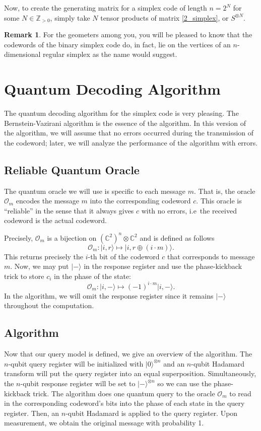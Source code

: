 \documentclass[12pt,twoside]{reedthesis}
\theoremstyle{definition}
\newtheorem{remark}[theorem]{Remark}
\newcommand{\Z}{\mathbb{Z}}
\newcommand{\C}{\mathbb{C}}
\newcommand{\ket}[1]{\ensuremath{\lvert #1\rangle}\xspace}
\newcommand{\Hminus}{\ensuremath{\lvert- \rangle}\xspace}
\begin{document}
Now, to create the generating matrix for a simplex code of length $n = 2^N$ for some $N \in \Z_{>0}$, simply take $N$ tensor products of matrix \ref{2_simplex}, or $S^{\otimes N}$.
\begin{remark}
For the geometers among you, you will be pleased to know that the codewords of the binary simplex code do, in fact, lie on the vertices of an $n$-dimensional regular simplex as the name would suggest.
\end{remark}
\section{Quantum Decoding Algorithm}
The quantum decoding algorithm for the simplex code is very pleasing. The Bernstein-Vazirani algorithm is the essence of the algorithm. In this version of the algorithm, we will assume that no errors occurred during the transmission of the codeword; later, we will analyze the performance of the algorithm with errors.
\subsection{Reliable Quantum Oracle}
The quantum oracle we will use is specific to each message $m$. That is, the oracle $\mathcal{O}_m$ encodes the message $m$ into the corresponding codeword $c$. This oracle is ``reliable'' in the sense that it always gives $c$ with no errors, i.e~the received codeword is the actual codeword. 

Precisely, $\mathcal{O}_m$ is a bijection on $(\C^2)^n \otimes \C^2$ and is defined as follows
\begin{equation*}
\mathcal{O}_m: \ket{i, r} \longmapsto \ket{i, r \oplus (i\cdot m)}.
\end{equation*} 
This returns precisely the $i$-th bit of the codeword $c$ that corresponds to message $m$. Now, we may put $\Hminus$ in the response register and use the phase-kickback trick to store $c_i$ in the phase of the state:
\begin{equation*}
\mathcal{O}_m: \ket{i, -} \longmapsto (-1)^{i \cdot m}\ket{i,-}.
\end{equation*}
In the algorithm, we will omit the response register since it remains $\Hminus$ throughout the computation.
\subsection{Algorithm}

Now that our query model is defined, we give an overview of the algorithm. The $n$-qubit query register will be initialized with $\ket{0}^{\otimes n}$ and an $n$-qubit Hadamard transform will put the query register into an equal superposition. Simultaneously, the $n$-qubit response register will be set to $\Hminus^{\otimes n}$ so we can use the phase-kickback trick. The algorithm does one quantum query to the oracle $\mathcal{O}_m$ to read in the corresponding codeword's bits into the phase of each state in the query register. Then, an $n$-qubit Hadamard is applied to the query register. Upon measurement, we obtain the original message with probability 1.
\end{document}
